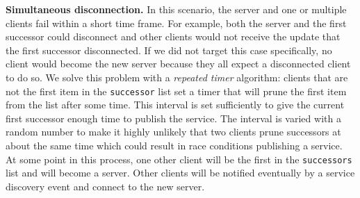 \textbf{Simultaneous disconnection.} In this scenario, the server and one or multiple clients fail within a short time frame. For example, both the server and the first successor could disconnect and other clients would not receive the update that the first successor disconnected. If we did not target this case specifically, no client would become the new server because they all expect a disconnected client to do so. We solve this problem with a \textit{repeated timer} algorithm: clients that are not the first item in the \texttt{successor} list set a timer that will prune the first item from the list after some time. This interval is set sufficiently to give the current first successor enough time to publish the service. The interval is varied with a random number to make it highly unlikely that two clients prune successors at about the same time which could result in race conditions publishing a service. At some point in this process, one other client will be the first in the \texttt{successors} list and will become a server. Other clients will be notified eventually by a service discovery event and connect to the new server.